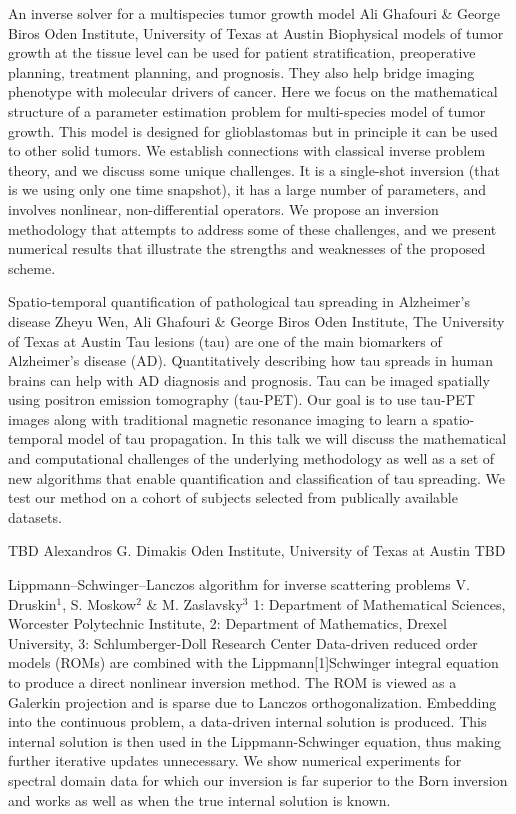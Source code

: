 \begin{addmargin}[2em]{0em}
\vspace{1.5ex}
\abs
{An inverse solver for a multispecies tumor growth model}
{Ali Ghafouri \& George Biros}
{Oden Institute, University of Texas at Austin}
{Biophysical models of tumor growth at the tissue level can be used for patient stratification, preoperative planning, treatment planning, and prognosis. They also help bridge imaging phenotype with molecular drivers of cancer. Here we focus on the mathematical structure of a parameter estimation problem for multi-species model of tumor growth. This model is designed for glioblastomas but in principle it can be used to other solid tumors.  We establish connections with classical inverse problem theory, and we discuss some unique challenges. It is a single-shot inversion (that is we using only one time snapshot), it has a large number of parameters, and involves nonlinear, non-differential operators. We propose an inversion methodology that attempts to address some of these challenges, and we present numerical results that illustrate the strengths and weaknesses of the proposed scheme.}


\vspace{1.5ex}
\abs
{Spatio-temporal quantification of pathological tau spreading in Alzheimer's disease}
{Zheyu Wen, Ali Ghafouri \& George Biros}
{Oden Institute, The University of Texas at Austin}
{Tau lesions (tau) are one of the main biomarkers of Alzheimer's disease (AD). Quantitatively describing how tau spreads in human brains can help with AD diagnosis and prognosis. Tau can be imaged spatially using positron emission tomography (tau-PET). Our goal is to use tau-PET images along with traditional magnetic resonance imaging to learn a spatio-temporal model of tau propagation. In this talk we will discuss the mathematical and computational challenges of the underlying methodology as well as a set of new algorithms that enable quantification and classification of tau spreading. We test our method on a cohort of subjects selected from publically available datasets.}


\vspace{1.5ex}
\abs
{TBD}
{Alexandros G. Dimakis}
{Oden Institute, University of Texas at Austin}
{TBD}


\vspace{1.5ex}
\abs
{{L}ippmann--{S}chwinger--{L}anczos algorithm for inverse scattering problems}
{V. Druskin$^{1}$, S. Moskow$^{2}$ \& M. Zaslavsky$^{3}$}
{1: Department of Mathematical Sciences, Worcester Polytechnic Institute, 2: Department of Mathematics, Drexel University, 3: Schlumberger-Doll Research Center}
{Data-driven reduced order models (ROMs) are combined with the Lippmann[1]Schwinger integral equation to produce a direct nonlinear inversion method. The ROM is viewed as a Galerkin projection and is sparse due to Lanczos orthogonalization. Embedding into the continuous problem, a data-driven internal solution is produced. This internal solution is then used in the Lippmann-Schwinger equation, thus making further iterative updates unnecessary. We show numerical experiments for spectral domain data for which our inversion is far superior to the Born inversion and works as well as when the true internal solution is known.}



\end{addmargin}
